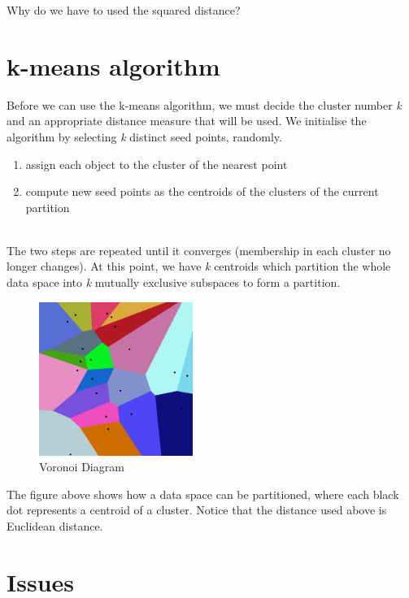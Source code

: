 \documentclass[11pt,fleqn]{book} %
\begin{document}
\begin{exercise}
Why do we have to used the squared distance?
\end{exercise}

\section{k-means algorithm}
Before we can use the k-means algorithm, we must decide the cluster number \textit{k} and an appropriate distance measure that will be used. We initialise the algorithm by selecting \textit{k} distinct seed points, randomly.\\

\begin{enumerate}
	\item assign each object to the cluster of the nearest point
	\item compute new seed points as the centroids of the clusters of the current partition
\end{enumerate}

\ \\ \noindent
The two steps are repeated until it converges (membership in each cluster no longer changes). At this point, we have \textit{k} centroids which partition the whole data space into \textit{k} mutually exclusive subspaces to form a partition.\\

\begin{figure}[h]
	\centering
  	\includegraphics[width=50mm, scale=0.7]{Pictures/voronoi}
  	\caption{Voronoi Diagram}
\end{figure}

\noindent
The figure above shows how a data space can be partitioned, where each black dot represents a centroid of a cluster. Notice that the distance used above is Euclidean distance.

\section{Issues}
\end{document}
